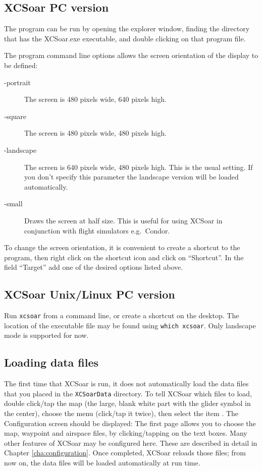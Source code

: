 \subsection*{XCSoar PC version}
The program can be run by opening the explorer window, finding the directory
that has the XCSoar.exe executable, and double clicking on that program file.

The program command line options allows the screen orientation of
the display to be defined:
\begin{description}
\item[-portrait] The screen is 480 pixels wide, 640 pixels high.
\item[-square] The screen is 480 pixels wide, 480 pixels high.
\item[-landscape] The screen is 640 pixels wide, 480 pixels high. This is the
usual setting. If you don't specify this parameter the landscape version will be
loaded automatically.
\item[-small] Draws the screen at half size.  This is useful for using XCSoar in
 conjunction with flight simulators e.g.\ Condor.
\end{description}
To change the screen orientation, it is convenient to create a shortcut to the
program, then right click on the shortcut icon and click on ``Shortcut''. 
In the field ``Target'' add one of the desired options listed above.

\subsection*{XCSoar Unix/Linux PC version}
Run \verb|xcsoar| from a command line, or create a shortcut on the
desktop.  The location of the executable file may be found using
\verb|which xcsoar|.  Only landscape mode is  supported for now.

\subsection*{Loading data files}
The first time that XCSoar is run, it does not automatically load the 
data files that you placed in the \verb|XCSoarData| directory.  
To tell XCSoar which files to load, double click/tap the map (the large,
blank white part with the glider symbol in the center),
choose the menu  (click/tap it twice), then select the item 
.  The Configuration screen should be displayed:
The first page allows you to choose the map, 
waypoint and airspace files, by clicking/tapping on the text boxes.
Many other features of XCSoar may be configured here. These are described in detail in Chapter
\ref{cha:configuration}.
Once completed, XCSoar reloads those files; from now on, the data files
will be loaded automatically at run time.

